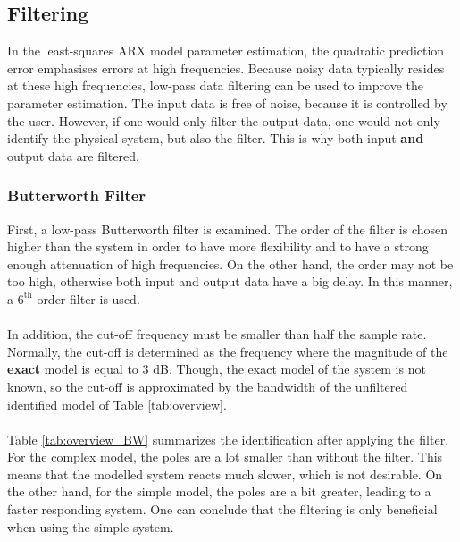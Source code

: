 \documentclass[a4paper,kul]{kulakarticle} %
\begin{document}

\subsection{Filtering}
In the least-squares ARX model parameter estimation, the quadratic prediction error emphasises errors at high frequencies. Because noisy data typically resides at these high frequencies, low-pass data filtering can be used to improve the parameter estimation. The input data is free of noise, because it is controlled by the user. However, if one would only filter the output data, one would not only identify the physical system, but also the filter. This is why both input \textbf{and} output data are filtered. 

\subsubsection{Butterworth Filter}
\label{subsub:BW}

First, a low-pass Butterworth filter is examined. The order of the filter is chosen higher than the system in order to have more flexibility and to have a strong enough attenuation of high frequencies. On the other hand, the order may not be too high, otherwise both input and output data have a big delay. In this manner, a $6^{\text{th}}$ order filter is used. 
\\\\
In addition, the cut-off frequency must be smaller than half the sample rate. Normally, the cut-off is determined as the frequency where the magnitude of the \textbf{exact} model is equal to 3 dB. Though, the exact model of the system is not known, so the cut-off is approximated by the bandwidth of the unfiltered identified model of Table \ref{tab:overview}. 
\\\\
Table \ref{tab:overview_BW} summarizes the identification after applying the filter. For the complex model, the poles are a lot smaller than without the filter. This means that the modelled system reacts much slower, which is not desirable. On the other hand, for the simple model, the poles are a bit greater, leading to a faster responding system. One can conclude that the filtering is only beneficial when using the simple system.
\end{document}
